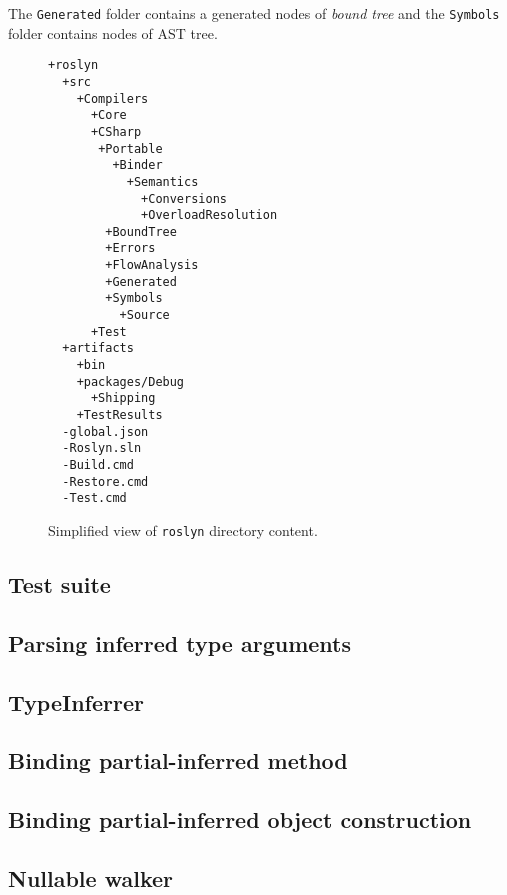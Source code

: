 The \texttt{Generated} folder contains a generated nodes of \textit{bound tree} and the \texttt{Symbols} folder contains nodes of \ac{AST} tree.
\begin{figure}[h]
\begin{lstlisting}[xleftmargin=.2\textwidth, xrightmargin=.2\textwidth]
+roslyn
  +src
    +Compilers
      +Core
      +CSharp
       +Portable
         +Binder
           +Semantics
             +Conversions
             +OverloadResolution
        +BoundTree
        +Errors
        +FlowAnalysis
        +Generated
        +Symbols
          +Source
      +Test
  +artifacts
    +bin
    +packages/Debug
      +Shipping
    +TestResults
  -global.json
  -Roslyn.sln
  -Build.cmd
  -Restore.cmd
  -Test.cmd
\end{lstlisting}
\caption{Simplified view of \texttt{roslyn} directory content.}
\label{img68:roslynFolder}
\end{figure}

\subsection{Test suite}


\subsection{Parsing inferred type arguments}


\subsection{TypeInferrer}


\subsection{Binding partial-inferred method}


\subsection{Binding partial-inferred object construction}


\subsection{Nullable walker}

